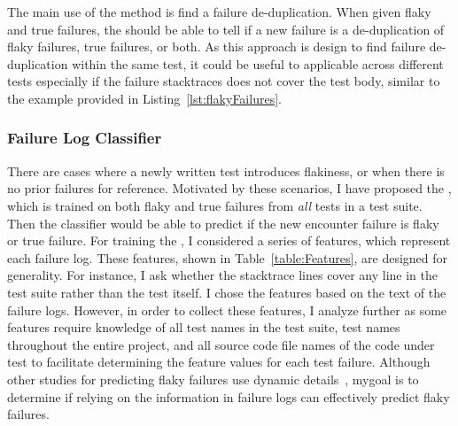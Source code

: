 The main use of the \syntax method is find a failure de-duplication. 
When given flaky and true failures, the \syntax should be able to tell if a new failure is a de-duplication of flaky failures, true failures, or both. 
As this approach is design to find failure de-duplication within the same test, it could be useful to applicable across different tests especially if the failure stacktraces does not cover the test body, similar to the example provided in Listing~\ref{lst:flakyFailures}.





\subsubsection{Failure Log Classifier}
\label{classifier}


There are cases where a newly written test introduces flakiness, or when there is no prior failures for reference.
Motivated by these scenarios, I have proposed the \classifier, which is trained on both flaky and true failures from \emph{all} tests in a test suite. Then the classifier would be able to predict if the new encounter failure is flaky or true failure.
For training the \classifier, I considered a series of features, which represent each failure log. These features, shown in Table~\ref{table:Features}, are designed for generality. For instance, I ask whether the stacktrace lines cover any line in the test suite rather than the test itself.
I chose the features based on the text of the failure logs. 
However, in order to collect these features, I analyze further as some features require knowledge of all test names in the test suite, test names throughout the entire project, and all source code file names of the code under test to facilitate determining the feature values for each test failure.  
Although other studies for predicting flaky failures use dynamic details~\cite{lampel2021life}, mygoal is to determine if relying on the information in failure logs can effectively predict flaky failures.

